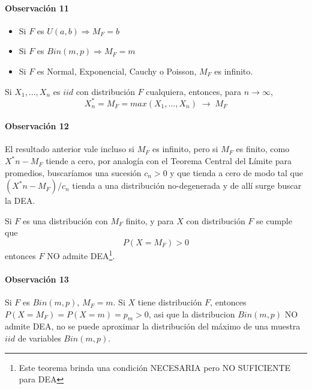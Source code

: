 \documentclass[
  12pt]{article}
\begin{document}
\paragraph*{Observación 11}

\begin{itemize}
\item Si $F$ es $U(a,b) \Rightarrow M_F=b$
\item Si $F$ es $Bin(m,p) \Rightarrow M_F=m$
\item Si $F$ es Normal, Exponencial, Cauchy o Poisson, $M_F$ es infinito.
\end{itemize}

\begin{theorem} 
Si $X_1,...,X_n$ es $iid$ con distribución $F$ cualquiera, entonces, para $n\longrightarrow \infty$,
\begin{equation}
X^*_n=M_F= max(X_1,...,X_n)\;\longrightarrow\;M_F \label{eq:Xast}
\end{equation}
\end{theorem}

\paragraph*{Observación 12}

El resultado anterior vale incluso si \(M_F\) es infinito, pero si
\(M_F\) es finito, como \(X^*n - M_F\) tiende a cero, por analogía con
el Teorema Central del Límite para promedios, buscaríamos una sucesión
\(c_n>0\) y que tienda a cero de modo tal que \((X^*n- M_F )/ c_n\)
tienda a una distribución no-degenerada y de allí surge buscar la DEA.

\begin{theorem}
Si $F$ es una distribución con $M_F$ finito, y para $X$ con distribución $F$ se cumple que
$$
P(X=M_F)>0 
$$
entonces $F$ NO admite DEA\footnote{Este teorema brinda una condición NECESARIA pero NO SUFICIENTE para DEA}.
\end{theorem}

\paragraph*{Observación 13}

Si \(F\) es \(Bin(m,p)\), \(M_F=m\). Si \(X\) tiene distribución \(F\),
entonces \(P( X=M_F)= P( X=m)= p_m>0\), asi que la distribucion
\(Bin(m,p)\) NO admite DEA, no se puede aproximar la distribución del
máximo de una muestra \(iid\) de variables \(Bin(m,p)\).
\end{document}
